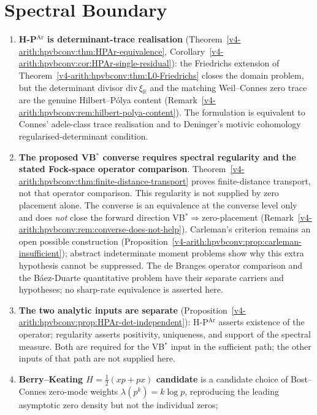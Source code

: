 \section{Spectral Boundary}
\label{v4-arith:hpvbconv:summary}

\begin{enumerate}
\item \textbf{H-P\(^{\mathrm{Ar}}\) is determinant-trace realisation}
(Theorem~\ref{v4-arith:hpvbconv:thm:HPAr-equivalence},
Corollary~\ref{v4-arith:hpvbconv:cor:HPAr-single-residual}): the Friedrichs
extension of Theorem~\ref{v4-arith:hpvbconv:thm:L0-Friedrichs} closes
the domain problem, but the determinant divisor
\(\mathrm{div}\,\xi_{\mathbb R}\) and the matching Weil--Connes zero
trace are the genuine Hilbert--P\'olya content
(Remark~\ref{v4-arith:hpvbconv:rem:hilbert-polya-content}). The
formulation is equivalent to Connes' adele-class trace realisation and
to Deninger's motivic cohomology
regularised-determinant condition.
\item \textbf{The proposed VB\(^{*}\) converse requires spectral
regularity and the stated Fock-space operator comparison}.
Theorem~\ref{v4-arith:hpvbconv:thm:finite-distance-transport}
proves finite-distance transport, not that operator comparison. This regularity is not
supplied by zero placement alone.
The converse is an equivalence at the converse level only and
does \emph{not} close the forward direction VB\(^{*}\Rightarrow\)zero-placement
(Remark~\ref{v4-arith:hpvbconv:rem:converse-does-not-help}).
Carleman's criterion remains an open possible construction
(Proposition~\ref{v4-arith:hpvbconv:prop:carleman-insufficient}); abstract
indeterminate moment problems show why this extra hypothesis
cannot be suppressed. The de Branges operator comparison and the
B\'aez-Duarte quantitative problem have their separate carriers and
hypotheses; no sharp-rate equivalence is asserted here.
\item \textbf{The two analytic inputs are separate}
(Proposition~\ref{v4-arith:hpvbconv:prop:HPAr-det-independent}): H-P\(^{\mathrm{Ar}}\)
asserts existence of the operator; regularity asserts positivity,
uniqueness, and support of the spectral measure. Both are required for
the VB\(^{*}\) input in the sufficient path; the other inputs of that path
are not supplied here.
\item \textbf{Berry--Keating \(H=\tfrac{1}{2}(xp+px)\) candidate} is a candidate choice
of Bost--Connes zero-mode weights \(\lambda(p^{k})=k\log p\), reproducing
the leading asymptotic zero density but not the individual zeros;

\end{enumerate}
